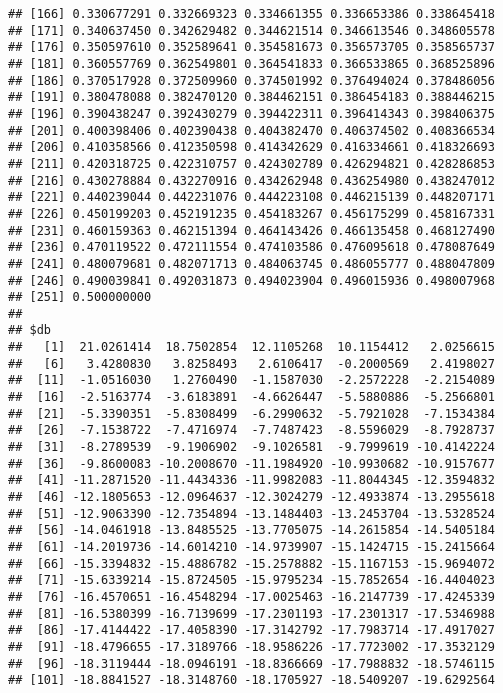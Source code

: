 \documentclass[]{article}
\begin{document}
\begin{verbatim}
## [166] 0.330677291 0.332669323 0.334661355 0.336653386 0.338645418
## [171] 0.340637450 0.342629482 0.344621514 0.346613546 0.348605578
## [176] 0.350597610 0.352589641 0.354581673 0.356573705 0.358565737
## [181] 0.360557769 0.362549801 0.364541833 0.366533865 0.368525896
## [186] 0.370517928 0.372509960 0.374501992 0.376494024 0.378486056
## [191] 0.380478088 0.382470120 0.384462151 0.386454183 0.388446215
## [196] 0.390438247 0.392430279 0.394422311 0.396414343 0.398406375
## [201] 0.400398406 0.402390438 0.404382470 0.406374502 0.408366534
## [206] 0.410358566 0.412350598 0.414342629 0.416334661 0.418326693
## [211] 0.420318725 0.422310757 0.424302789 0.426294821 0.428286853
## [216] 0.430278884 0.432270916 0.434262948 0.436254980 0.438247012
## [221] 0.440239044 0.442231076 0.444223108 0.446215139 0.448207171
## [226] 0.450199203 0.452191235 0.454183267 0.456175299 0.458167331
## [231] 0.460159363 0.462151394 0.464143426 0.466135458 0.468127490
## [236] 0.470119522 0.472111554 0.474103586 0.476095618 0.478087649
## [241] 0.480079681 0.482071713 0.484063745 0.486055777 0.488047809
## [246] 0.490039841 0.492031873 0.494023904 0.496015936 0.498007968
## [251] 0.500000000
## 
## $db
##   [1]  21.0261414  18.7502854  12.1105268  10.1154412   2.0256615
##   [6]   3.4280830   3.8258493   2.6106417  -0.2000569   2.4198027
##  [11]  -1.0516030   1.2760490  -1.1587030  -2.2572228  -2.2154089
##  [16]  -2.5163774  -3.6183891  -4.6626447  -5.5880886  -5.2566801
##  [21]  -5.3390351  -5.8308499  -6.2990632  -5.7921028  -7.1534384
##  [26]  -7.1538722  -7.4716974  -7.7487423  -8.5596029  -8.7928737
##  [31]  -8.2789539  -9.1906902  -9.1026581  -9.7999619 -10.4142224
##  [36]  -9.8600083 -10.2008670 -11.1984920 -10.9930682 -10.9157677
##  [41] -11.2871520 -11.4434336 -11.9982083 -11.8044345 -12.3594832
##  [46] -12.1805653 -12.0964637 -12.3024279 -12.4933874 -13.2955618
##  [51] -12.9063390 -12.7354894 -13.1484403 -13.2453704 -13.5328524
##  [56] -14.0461918 -13.8485525 -13.7705075 -14.2615854 -14.5405184
##  [61] -14.2019736 -14.6014210 -14.9739907 -15.1424715 -15.2415664
##  [66] -15.3394832 -15.4886782 -15.2578882 -15.1167153 -15.9694072
##  [71] -15.6339214 -15.8724505 -15.9795234 -15.7852654 -16.4404023
##  [76] -16.4570651 -16.4548294 -17.0025463 -16.2147739 -17.4245339
##  [81] -16.5380399 -16.7139699 -17.2301193 -17.2301317 -17.5346988
##  [86] -17.4144422 -17.4058390 -17.3142792 -17.7983714 -17.4917027
##  [91] -18.4796655 -17.3189766 -18.9586226 -17.7723002 -17.3532129
##  [96] -18.3119444 -18.0946191 -18.8366669 -17.7988832 -18.5746115
## [101] -18.8841527 -18.3148760 -18.1705927 -18.5409207 -19.6292564

\end{verbatim}
\end{document}
